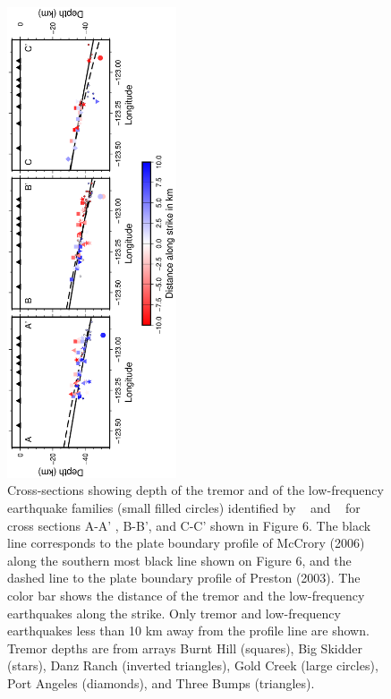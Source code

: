 \documentclass[draft]{agujournal2019}
\begin{document}
\begin{figure}
\noindent\includegraphics[width=5cm, trim={4.5cm 0.5cm 6cm 0cm},clip, angle=270]{figures/section_strike_PWS_PWS.eps}
\caption{Cross-sections showing depth of the tremor and of the low-frequency earthquake families (small filled circles) identified by ~ and ~ for cross sections A-A' , B-B', and C-C' shown in Figure 6. The black line corresponds to the plate boundary profile of McCrory (2006) along the southern most black line shown on Figure 6, and the dashed line to the plate boundary profile of Preston (2003). The color bar shows the distance of the tremor and the low-frequency earthquakes along the strike. Only tremor and low-frequency earthquakes less than 10 km away from the profile line are shown. Tremor depths are from arrays Burnt Hill (squares), Big Skidder (stars), Danz Ranch (inverted triangles),  Gold Creek (large circles), Port Angeles (diamonds), and Three Bumps (triangles).}
\label{pngfiguresample}
\end{figure}
\end{document}
